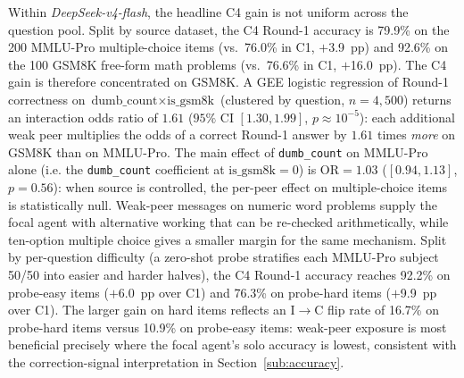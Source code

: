 \documentclass[review,3p,authoryear]{elsarticle}
\begin{document}
Within \textit{DeepSeek-v4-flash}, the headline C4 gain is not uniform
across the question pool.
Split by source dataset, the C4 Round-1 accuracy is 79.9\% on the 200
MMLU-Pro multiple-choice items (vs.\ 76.0\% in C1, $+$3.9~pp) and 92.6\%
on the 100 GSM8K free-form math problems (vs.\ 76.6\% in C1, $+$16.0~pp).
The C4 gain is therefore concentrated on GSM8K.
A GEE logistic regression of Round-1 correctness on
$\text{dumb\_count} \times \text{is\_gsm8k}$ (clustered by question,
$n = 4{,}500$) returns an interaction odds ratio of $1.61$
($95\%$ CI $[1.30, 1.99]$, $p \approx 10^{-5}$): each additional
weak peer multiplies the odds of a correct Round-1 answer by $1.61$
times \emph{more} on GSM8K than on MMLU-Pro.
The main effect of \texttt{dumb\_count} on MMLU-Pro alone (i.e. the
\texttt{dumb\_count} coefficient at $\text{is\_gsm8k} = 0$) is
$\mathrm{OR} = 1.03$ ($[0.94, 1.13]$, $p = 0.56$): when source is
controlled, the per-peer effect on multiple-choice items is
statistically null. Weak-peer messages on numeric word problems
supply the focal agent with alternative working that can be
re-checked arithmetically, while ten-option multiple choice gives a
smaller margin for the same mechanism.
Split by per-question difficulty (a zero-shot probe stratifies each
MMLU-Pro subject 50/50 into easier and harder halves), the C4 Round-1
accuracy reaches 92.2\% on probe-easy items ($+$6.0~pp over C1) and
76.3\% on probe-hard items ($+$9.9~pp over C1).
The larger gain on hard items reflects an I$\rightarrow$C flip rate of
16.7\% on probe-hard items versus 10.9\% on probe-easy items: weak-peer
exposure is most beneficial precisely where the focal agent's solo
accuracy is lowest, consistent with the correction-signal
interpretation in Section~\ref{sub:accuracy}.
\end{document}
